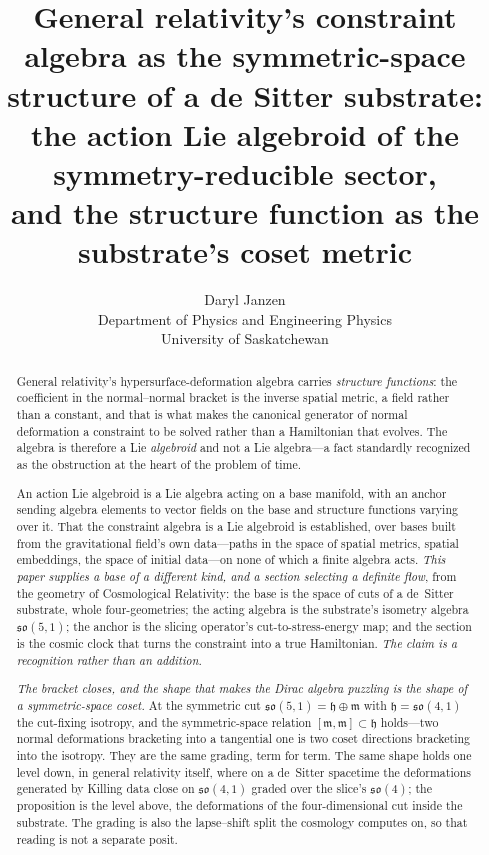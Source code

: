 \documentclass[11pt,a4paper]{article}
\title{General relativity's constraint algebra as the symmetric-space\\
structure of a de Sitter substrate:\\
\large the action Lie algebroid of the symmetry-reducible sector,\\ and the structure function as the substrate's coset metric}
\author{Daryl Janzen\\
\small Department of Physics and Engineering Physics\\
\small University of Saskatchewan}
\date{}
\theoremstyle{plain}
\theoremstyle{definition}
\theoremstyle{remark}
\newcommand{\so}{\mathfrak{so}}
\newcommand{\fh}{\mathfrak{h}}
\newcommand{\fm}{\mathfrak{m}}
\begin{document}
\maketitle

\begin{abstract}
General relativity's hypersurface-deformation algebra carries \emph{structure functions}: the coefficient in the normal--normal bracket is the inverse spatial metric, a field rather than a constant, and that is what makes the canonical generator of normal deformation a constraint to be solved rather than a Hamiltonian that evolves. The algebra is therefore a Lie \emph{algebroid} and not a Lie algebra---a fact standardly recognized as the obstruction at the heart of the problem of time.

An action Lie algebroid is a Lie algebra acting on a base manifold, with an anchor sending algebra elements to vector fields on the base and structure functions varying over it. That the constraint algebra is a Lie algebroid is established, over bases built from the gravitational field's own data---paths in the space of spatial metrics, spatial embeddings, the space of initial data---on none of which a finite algebra acts. \emph{This paper supplies a base of a different kind, and a section selecting a definite flow}, from the geometry of Cosmological Relativity: the base is the space of cuts of a de~Sitter substrate, whole four-geometries; the acting algebra is the substrate's isometry algebra $\so(5,1)$; the anchor is the slicing operator's cut-to-stress-energy map; and the section is the cosmic clock that turns the constraint into a true Hamiltonian. \emph{The claim is a recognition rather than an addition.}

\emph{The bracket closes, and the shape that makes the Dirac algebra puzzling is the shape of a symmetric-space coset.} At the symmetric cut $\so(5,1)=\fh\oplus\fm$ with $\fh=\so(4,1)$ the cut-fixing isotropy, and the symmetric-space relation $[\fm,\fm]\subset\fh$ holds---two normal deformations bracketing into a tangential one is two coset directions bracketing into the isotropy. They are the same grading, term for term. The same shape holds one level down, in general relativity itself, where on a de~Sitter spacetime the deformations generated by Killing data close on $\so(4,1)$ graded over the slice's $\so(4)$; the proposition is the level above, the deformations of the four-dimensional cut inside the substrate. The grading is also the lapse--shift split the cosmology computes on, so that reading is not a separate posit.


\end{abstract}
\end{document}
